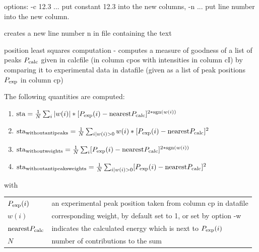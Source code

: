 \begin{description}
 options: -c 12.3 ...  put constant 12.3 into the new columns, -n ... put line number into the new column.
\item [\prg newline\index{newline}\label{newline} n text file:] creates a new line number n  in file containing %
the text 
\item [\prg posls\index{posls}\label{posls} {[options]} cp datafile cpos cI calcfile:]  
position least squares computation - 
                computes a measure of goodness of a list of peaks $P_{\rm calc}$
                given  in {\prg calcfile} (in column {\prg cpos}
 with intensities in column {\prg cI})
                by comparing it to experimental data in {\prg datafile}
                (given as a list of peak positions $P_{\rm exp}$ in column {\prg cp})

                The following quantities are computed:
\begin{enumerate}
\item ${\rm sta}                               = \frac{1}{N}  \sum_{i} |w(i)|*[P_{\rm exp}(i) - {\rm nearest}P_{\rm calc}]^{2*{\rm sgn}(w(i))}$
\item ${\rm sta}_{\rm without antipeaks }            = \frac{1}{N}  \sum_{i|w(i)>0}  w(i)*[P_{\rm exp}(i) - {\rm nearest}P_{\rm calc}]^2$
\item ${\rm sta}_{\rm without weights}               = \frac{1}{N}  \sum_{i} [P_{\rm exp}(i) - {\rm nearest}P_{\rm calc}]^{2*{\rm sgn}(w(i))}$
\item ${\rm sta}_{\rm without antipeaks weights}     = \frac{1}{N}  \sum_{i|w(i)>0} [P_{\rm exp}(i) - {\rm nearest}P_{\rm calc}]^2$
\end{enumerate}
with 
\begin{tabular}{ll}
$P_{\rm exp}(i)$ & an experimental peak position taken from column cp in datafile \\
$w(i)$           & corresponding weight, by default set to 1, or set by option -w \\
${\rm nearest}P_{\rm calc}$ & indicates the calculated energy which is next to $P_{\rm exp}(i)$\\
$N$ & number of contributions to the sum\\
\end{tabular}


\end{description}
